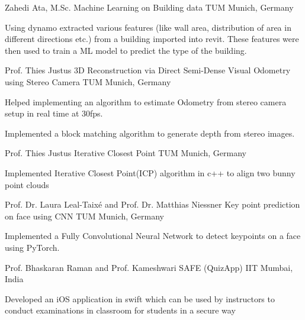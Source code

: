 \begin{cventries}
	\cventry
	{Zahedi Ata, M.Sc.} %
	{Machine Learning on Building data} %
	{TUM Munich, Germany} %
	{} %
	{
		\begin{cvitems} %
			\item {Using dynamo extracted various features (like wall area, distribution of area in different directions etc.) from a building imported into revit. These features were then used to train a ML model to predict the type of the building.}
		\end{cvitems}
	}

  \cventry
    {Prof. Thies Justus} %
    {3D Reconstruction via Direct Semi-Dense Visual Odometry using Stereo Camera} %
    {TUM Munich, Germany} %
    {} %
    {
      \begin{cvitems} %
      	\item {Helped implementing an algorithm to estimate Odometry from stereo camera setup in real time at 30fps.}
		\item {Implemented a block matching algorithm to generate depth from stereo images.}
      \end{cvitems}
    }

	\cventry
	{Prof. Thies Justus} %
	{Iterative Closest Point} %
	{TUM Munich, Germany} %
	{} %
	{
		\begin{cvitems} %
			\item {Implemented Iterative Closest Point(ICP) algorithm in c++ to align two bunny point clouds}
		\end{cvitems}
	}

	\cventry
	{Prof. Dr. Laura Leal-Taixé and Prof. Dr. Matthias Niessner} %
	{Key point prediction on face using CNN} %
	{TUM Munich, Germany} %
	{} %
	{
		\begin{cvitems} %
			\item {Implemented a Fully Convolutional Neural Network to detect keypoints on a face using PyTorch.}
		\end{cvitems}
	}
	
	\cventry
	{Prof. Bhaskaran Raman and Prof. Kameshwari} %
	{SAFE (QuizApp)} %
	{IIT Mumbai, India} %
	{} %
	{
		\begin{cvitems} %
			\item {Developed an iOS application in swift which can be used by instructors to conduct examinations in classroom for students in a secure way}
		\end{cvitems}
	}
	

\end{cventries}
